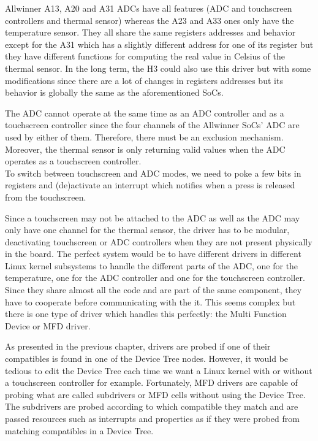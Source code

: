 Allwinner A13, A20 and A31 ADCs have all features (ADC and touchscreen controllers and thermal sensor) whereas the A23 and A33 ones only have the temperature sensor. They all share the same registers addresses and behavior except for the A31 which has a slightly different address for one of its register but they have different functions for computing the real value in Celsius of the thermal sensor. In the long term, the H3 could also use this driver but with some modifications since there are a lot of changes in registers addresses but its behavior is globally the same as the aforementioned SoCs.

The ADC cannot operate at the same time as an ADC controller and as a touchscreen controller since the four channels of the Allwinner SoCs' ADC are used by either of them. Therefore, there must be an exclusion mechanism. Moreover, the thermal sensor is only returning valid values when the ADC operates as a touchscreen controller.\\
To switch between touchscreen and ADC modes, we need to poke a few bits in registers and (de)activate an interrupt which notifies when a press is released from the touchscreen.

Since a touchscreen may not be attached to the ADC as well as the ADC may only have one channel for the thermal sensor, the driver has to be modular, deactivating touchscreen or ADC controllers when they are not present physically in the board. The perfect system would be to have different drivers in different Linux kernel subsystems to handle the different parts of the ADC, one for the temperature, one for the ADC controller and one for the touchscreen controller. Since they share almost all the code and are part of the same component, they have to cooperate before communicating with the it. This seems complex but there is one type of driver which handles this perfectly: the Multi Function Device or MFD driver.

As presented in the previous chapter, drivers are probed if one of their compatibles is found in one of the Device Tree nodes. However, it would be tedious to edit the Device Tree each time we want a Linux kernel with or without a touchscreen controller for example. Fortunately, MFD drivers are capable of probing what are called subdrivers or MFD cells without using the Device Tree. The subdrivers are probed according to which compatible they match and are passed resources such as interrupts and properties as if they were probed from matching compatibles in a Device Tree.

